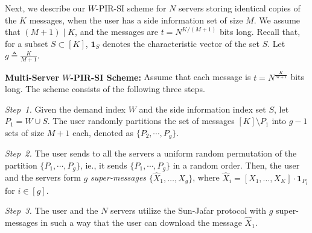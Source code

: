 \documentclass[letterpaper, 10 pt, conference]{ieeeconf}
\newcommand\salim[1]{\add[salim]{#1}}
\begin{document}




Next, we describe our $W$-PIR-SI scheme for $N$ servers storing identical copies of the $K$ messages, when the user has a side information set of size $M$. We assume that $(M+1)\mid K$, and the messages are $t = N^{K/(M+1)}$ bits long. Recall that, for a subset $S \subset [K]$, $\mathbf{1}_S$ denotes the characteristic vector of the set $S$. %
Let $g\triangleq\frac{K}{M+1}$.

{\bf  Multi-Server $W$-PIR-SI Scheme:}
Assume that each message is $t = N^{\frac{K}{M+1}}$ bits long.  The scheme consists of the following three steps.

{\it Step~1.} Given the demand index $W$ and the side information index set $S$, let $P_1 = W\cup S$. The user randomly partitions the set of messages $[K] \setminus P_{1}$ into $g - 1$ sets of size $M+1$ each, denoted as $\{P_2,\cdots,P_{g}\}$. 

{\it Step~2.} The user sends to all the servers a uniform random permutation of the partition $\{P_1, \cdots, P_g\}$, ie., it sends $\{P_1, \cdots, P_g\}$ in a random order. Then, the user and the servers form $g$ {\it super-messages} $\{\hat{X}_1,\dots,\hat{X}_g\}$, where $\hat{X}_i = [X_1,\dots,X_K]\cdot\mathbf{1}_{P_i}$ for $i\in[g]$.

{\it Step~3.} The user and the $N$ servers utilize the Sun-Jafar protocol with $g$ super-messages in such a way that the user can download the message $\hat{X}_1$. %
\end{document}
